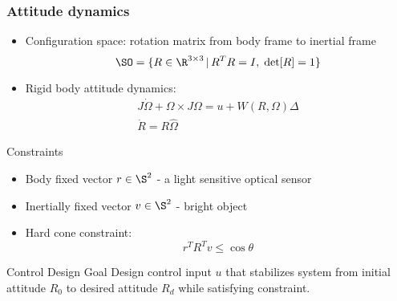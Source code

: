 \documentclass[11pt,professionalfonts]{beamer}
\begin{document}
\begin{frame} %
\frametitle{Attitude dynamics} 
\begin{itemize}

	\item Configuration space: rotation matrix from body frame to inertial frame
	 \[\SO =  \{R\in\R^{3\times 3}\,|\, R^TR=I,\;\mathrm{det}[R]=1\} \]
	\item Rigid body attitude dynamics:
\begin{gather*}
	J\dot\Omega + \Omega\times J\Omega = u+W(R,\Omega)\Delta \\
	\dot R = R\hat\Omega 
\end{gather*}
\end{itemize}

\end{frame}   %

\begin{frame}{Constraints} %
	\begin{itemize}
		\item Body fixed vector \( r \in \S^2\) - a light sensitive optical sensor
		\item Inertially fixed vector \( v \in \S^2 \) - bright object 
		\item Hard cone constraint:
		\[
			r^T R^T v \leq \cos \theta
		\]
	\end{itemize}
	\pause
	\begin{block}{Control Design Goal}
		Design control input \( u \) that stabilizes system from initial attitude \( R_0 \) to desired attitude \( R_d \) while satisfying constraint.
	\end{block}
\end{frame}%
\end{document}
